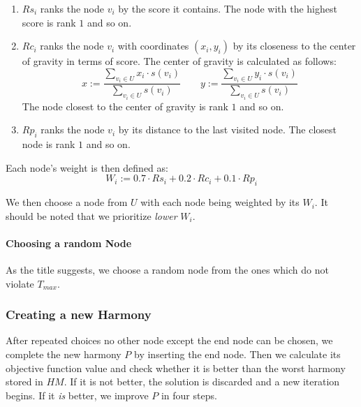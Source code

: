 \begin{enumerate}
	\item $Rs_i$ ranks the node $v_i$ by the score it contains. The node with the highest score is rank $1$ and so on.
	\item $Rc_i$ ranks the node $v_i$ with coordinates $(x_i, y_i)$ by its closeness to the center of gravity in terms of score. The center of gravity is calculated as follows:
	      \begin{equation*}
		      x := \frac{\sum_{v_i \in U} x_i \cdot s(v_i)}{\sum_{v_i \in U} s(v_i)}\quad\quad
		      y := \frac{\sum_{v_i \in U} y_i \cdot s(v_i)}{\sum_{v_i \in U} s(v_i)}
	      \end{equation*}
	      The node closest to the center of gravity is rank $1$ and so on.
	\item $Rp_i$ ranks the node $v_i$ by its distance to the last visited node.
	      The closest node is rank $1$ and so on.
\end{enumerate}

Each node's weight is then defined as:
\begin{equation*}
  W_i := 0.7 \cdot Rs_i + 0.2 \cdot Rc_i + 0.1 \cdot Rp_i
\end{equation*}

We then choose a node from $U$ with each node being weighted by its $W_i$.
It should be noted that we prioritize \emph{lower} $W_i$.

\paragraph{Choosing a random Node}

As the title suggests, we choose a random node from the ones which do not violate $T_{max}$.

\subsubsection{Creating a new Harmony}
\label{subsubsec:04:createharmony}

After repeated choices no other node except the end node can be chosen, we complete the new harmony $P$ by inserting the end node.
Then we calculate its objective function value and check whether it is better than the worst harmony stored in $HM$.
If it is not better, the solution is discarded and a new iteration begins.
If it \emph{is} better, we improve $P$ in four steps.

